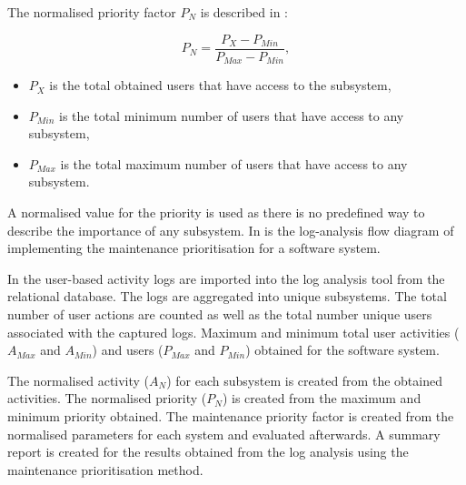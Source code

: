 The normalised priority factor $P_N$ is described in :

\begin{equation}
	\label{eq:ch2_priorityNormalised}
	P_{N} = \frac{P_X - P_{Min}}{P_{Max} - P_{Min}},
\end{equation}

\begin{itemize}
	\item $P_X$ is the total obtained users that have access to the subsystem,
	\item $P_{Min}$ is the total minimum number of users that have access to any subsystem,
	\item $P_{Max}$ is the total maximum number of users that have access to any subsystem.
\end{itemize}

A normalised value for the priority is used as there is no predefined way to describe the importance of any subsystem. In  is the log-analysis flow diagram of implementing the maintenance prioritisation for a software system. \par In  the user-based activity logs are imported into the log analysis tool from the relational database. The logs are aggregated into unique subsystems. The total number of user actions are counted as well as the total number unique users associated with the captured logs. Maximum and minimum total user activities ($A_{Max}$ and $A_{Min}$) and users ($P_{Max}$ and $P_{Min}$) obtained for the software system. \par The normalised activity ($A_N$) for each subsystem is created from the obtained activities. The normalised priority ($P_N$) is created from the maximum and minimum priority obtained. The maintenance priority factor is created from the normalised parameters for each system and evaluated afterwards. A summary report is created for the results obtained from the log analysis using the maintenance prioritisation method.

\clearpage

